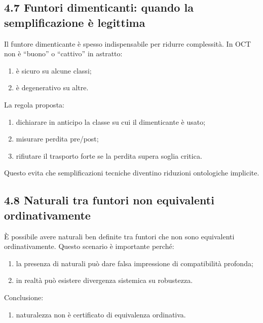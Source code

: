 \subsection{4.7 Funtori dimenticanti: quando la semplificazione è legittima}

Il funtore dimenticante è spesso indispensabile per ridurre complessità. In OCT non è ``buono'' o ``cattivo'' in astratto:

\begin{enumerate}
\def\labelenumi{\arabic{enumi}.}
\tightlist
\item
  è sicuro su alcune classi;
\item
  è degenerativo su altre.
\end{enumerate}

La regola proposta:

\begin{enumerate}
\def\labelenumi{\arabic{enumi}.}
\tightlist
\item
  dichiarare in anticipo la classe su cui il dimenticante è usato;
\item
  misurare perdita pre/post;
\item
  rifiutare il trasporto forte se la perdita supera soglia critica.
\end{enumerate}

Questo evita che semplificazioni tecniche diventino riduzioni ontologiche implicite.

\subsection{4.8 Naturali tra funtori non equivalenti ordinativamente}

È possibile avere naturali ben definite tra funtori che non sono equivalenti ordinativamente. Questo scenario è importante perché:

\begin{enumerate}
\def\labelenumi{\arabic{enumi}.}
\tightlist
\item
  la presenza di naturali può dare falsa impressione di compatibilità profonda;
\item
  in realtà può esistere divergenza sistemica su robustezza.
\end{enumerate}

Conclusione:

\begin{enumerate}
\def\labelenumi{\arabic{enumi}.}
\tightlist
\item
  naturalezza non è certificato di equivalenza ordinativa.
\end{enumerate}


